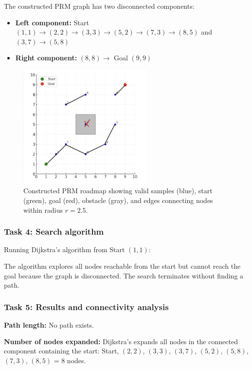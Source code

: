 \documentclass[11pt]{article}
\begin{document}
The constructed PRM graph has two disconnected components:
\begin{itemize}
    \item \textbf{Left component:} Start $(1,1) \rightarrow (2,2) \rightarrow (3,3) \rightarrow (5,2) \rightarrow (7,3) \rightarrow (8,5)$ and $(3,7) \rightarrow (5,8)$
    \item \textbf{Right component:} $(8,8) \rightarrow$ Goal $(9,9)$
\end{itemize}

\begin{figure}[h]
    \centering
    \includegraphics[width=0.6\textwidth]{roadmapimg.png}
    \caption{Constructed PRM roadmap showing valid samples (blue), start (green), goal (red), obstacle (gray), and edges connecting nodes within radius $r = 2.5$.}
    \label{fig:prm_roadmap}
\end{figure}


\subsubsection*{Task 4: Search algorithm}

Running Dijkstra's algorithm from Start $(1,1)$:

The algorithm explores all nodes reachable from the start but cannot reach the goal because the graph is disconnected. The search terminates without finding a path.

\subsubsection*{Task 5: Results and connectivity analysis}

\textbf{Path length:} No path exists.

\textbf{Number of nodes expanded:} Dijkstra's expands all nodes in the connected component containing the start: Start, $(2,2)$, $(3,3)$, $(3,7)$, $(5,2)$, $(5,8)$, $(7,3)$, $(8,5)$ = 8 nodes.
\end{document}
